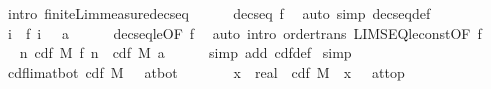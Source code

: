 \documentclass[leqno]{article}
\theoremstyle{definition}
\begin{document}
\begin{isabellebody}
\ {\isacharparenleft}intro\ finite{\isacharunderscore}Lim{\isacharunderscore}measure{\isacharunderscore}decseq{\isacharparenright}\isanewline
\ \ \ \ \isamarkupfalse%
\ {\isacharbackquoteopen}decseq\ f{\isacharbackquoteclose}\ \isamarkupfalse%
\ {\isacharparenleft}auto\ simp{\isacharcolon}\ decseq{\isacharunderscore}def{\isacharparenright}\isanewline
\ \ \ \ \isamarkupfalse%
\isanewline
\ \ \isamarkupfalse%
\ \isamarkupfalse%
\ {\isachardoublequoteopen}{\isacharparenleft}{\isasymInter}i{\isachardot}\ {\isacharbraceleft}{\isachardot}{\isachardot}\ f\ i{\isacharbraceright}{\isacharparenright}\ {\isacharequal}\ {\isacharbraceleft}{\isachardot}{\isachardot}\ a{\isacharbraceright}{\isachardoublequoteclose}\isanewline
\ \ \ \ \isamarkupfalse%
\ decseq{\isacharunderscore}le{\isacharbrackleft}OF\ f{\isacharbrackright}\ \isamarkupfalse%
\ {\isacharparenleft}auto\ intro{\isacharcolon}\ order{\isacharunderscore}trans\ LIMSEQ{\isacharunderscore}le{\isacharunderscore}const{\isacharbrackleft}OF\ f{\isacharparenleft}{}{\isacharparenright}{\isacharbrackright}{\isacharparenright}\isanewline
\ \ \isamarkupfalse%
\ \isamarkupfalse%
\ {\isachardoublequoteopen}{\isacharparenleft}{\isasymlambda}n{\isachardot}\ cdf\ M\ {\isacharparenleft}f\ n{\isacharparenright}{\isacharparenright}\ {\isacharminus}{\isacharminus}{\isacharminus}{\isacharminus}{\isachargreater}\ cdf\ M\ a{\isachardoublequoteclose}\isanewline
\ \ \ \ \isamarkupfalse%
\ {\isacharparenleft}simp\ add{\isacharcolon}\ cdf{\isacharunderscore}def{\isacharparenright}\isanewline
{}\isamarkupfalse%
\ simp%
\isanewline\isanewline%
\isamarkupfalse%
\ cdf{\isacharunderscore}lim{\isacharunderscore}at{\isacharunderscore}bot{\isacharcolon}\ {\isachardoublequoteopen}{\isacharparenleft}cdf\ M\ {\isacharminus}{\isacharminus}{\isacharminus}{\isachargreater}\ {}{\isacharparenright}\ at{\isacharunderscore}bot{\isachardoublequoteclose}\isanewline
{}\isamarkupfalse%
\ {\isacharminus}\ \isanewline
\ \ \isamarkupfalse%
\ {}{\isacharcolon}\ {\isachardoublequoteopen}{\isacharparenleft}{\isacharparenleft}{\isacharpercent}x\ {\isacharcolon}{\isacharcolon}\ real{\isachardot}\ {\isacharminus}\ cdf\ M\ {\isacharparenleft}{\isacharminus}\ x{\isacharparenright}{\isacharparenright}\ {\isacharminus}{\isacharminus}{\isacharminus}{\isachargreater}\ {}{\isacharparenright}\ at{\isacharunderscore}top{\isachardoublequoteclose}\isanewline

\end{isabellebody}
\end{document}
